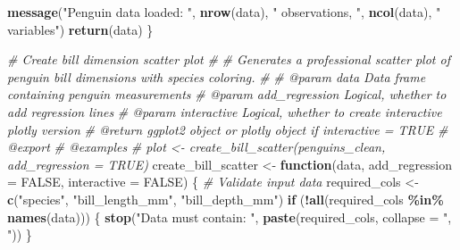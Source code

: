 \documentclass[
]{article}
\newenvironment{Shaded}{\begin{snugshade}}{\end{snugshade}}
\newcommand{\AttributeTok}[1]{\textcolor[rgb]{0.13,0.29,0.53}{#1}}
\newcommand{\CommentTok}[1]{\textcolor[rgb]{0.56,0.35,0.01}{\textit{#1}}}
\newcommand{\ConstantTok}[1]{\textcolor[rgb]{0.56,0.35,0.01}{#1}}
\newcommand{\ControlFlowTok}[1]{\textcolor[rgb]{0.13,0.29,0.53}{\textbf{#1}}}
\newcommand{\FunctionTok}[1]{\textcolor[rgb]{0.13,0.29,0.53}{\textbf{#1}}}
\newcommand{\NormalTok}[1]{#1}
\newcommand{\OtherTok}[1]{\textcolor[rgb]{0.56,0.35,0.01}{#1}}
\newcommand{\SpecialCharTok}[1]{\textcolor[rgb]{0.81,0.36,0.00}{\textbf{#1}}}
\newcommand{\StringTok}[1]{\textcolor[rgb]{0.31,0.60,0.02}{#1}}
\begin{document}
\begin{Shaded}
\begin{Highlighting}[]
  \FunctionTok{message}\NormalTok{(}\StringTok{"Penguin data loaded: "}\NormalTok{, }\FunctionTok{nrow}\NormalTok{(data), }\StringTok{" observations, "}\NormalTok{, }\FunctionTok{ncol}\NormalTok{(data), }\StringTok{" variables"}\NormalTok{)}
  \FunctionTok{return}\NormalTok{(data)}
\NormalTok{\}}

\CommentTok{\#\textquotesingle{} Create bill dimension scatter plot}
\CommentTok{\#\textquotesingle{}}
\CommentTok{\#\textquotesingle{} Generates a professional scatter plot of penguin bill dimensions with species coloring.}
\CommentTok{\#\textquotesingle{}}
\CommentTok{\#\textquotesingle{} @param data Data frame containing penguin measurements}
\CommentTok{\#\textquotesingle{} @param add\_regression Logical, whether to add regression lines}
\CommentTok{\#\textquotesingle{} @param interactive Logical, whether to create interactive plotly version}
\CommentTok{\#\textquotesingle{} @return ggplot2 object or plotly object if interactive = TRUE}
\CommentTok{\#\textquotesingle{} @export}
\CommentTok{\#\textquotesingle{} @examples}
\CommentTok{\#\textquotesingle{} plot \textless{}{-} create\_bill\_scatter(penguins\_clean, add\_regression = TRUE)}
\NormalTok{create\_bill\_scatter }\OtherTok{\textless{}{-}} \ControlFlowTok{function}\NormalTok{(data, }\AttributeTok{add\_regression =} \ConstantTok{FALSE}\NormalTok{, }\AttributeTok{interactive =} \ConstantTok{FALSE}\NormalTok{) \{}
  \CommentTok{\# Validate input data}
\NormalTok{  required\_cols }\OtherTok{\textless{}{-}} \FunctionTok{c}\NormalTok{(}\StringTok{"species"}\NormalTok{, }\StringTok{"bill\_length\_mm"}\NormalTok{, }\StringTok{"bill\_depth\_mm"}\NormalTok{)}
  \ControlFlowTok{if}\NormalTok{ (}\SpecialCharTok{!}\FunctionTok{all}\NormalTok{(required\_cols }\SpecialCharTok{\%in\%} \FunctionTok{names}\NormalTok{(data))) \{}
    \FunctionTok{stop}\NormalTok{(}\StringTok{"Data must contain: "}\NormalTok{, }\FunctionTok{paste}\NormalTok{(required\_cols, }\AttributeTok{collapse =} \StringTok{", "}\NormalTok{))}
\NormalTok{  \}}


\end{Highlighting}
\end{Shaded}
\end{document}
